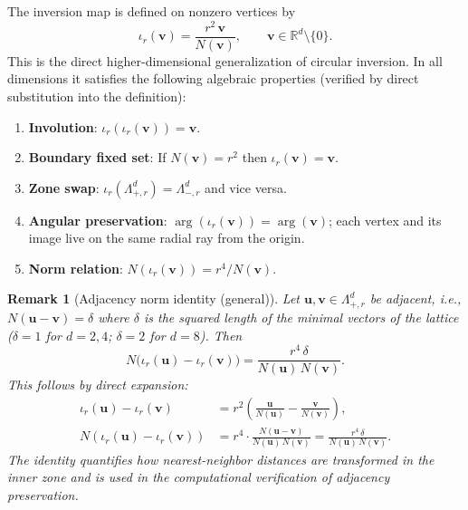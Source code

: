 \documentclass{article}
\newtheorem{remark}{Remark}
\begin{document}
The inversion map is defined on nonzero vertices by
\[
\iota_r(\mathbf{v}) = \frac{r^2 \, \mathbf{v}}{N(\mathbf{v})}, \qquad \mathbf{v} \in \mathbb{R}^d \setminus \{0\}.
\]
This is the direct higher-dimensional generalization of circular inversion. In all dimensions it satisfies the following algebraic properties (verified by direct substitution into the definition):
\begin{enumerate}
  \item \textbf{Involution}: $\iota_r(\iota_r(\mathbf{v})) = \mathbf{v}$.
  \item \textbf{Boundary fixed set}: If $N(\mathbf{v}) = r^2$ then $\iota_r(\mathbf{v}) = \mathbf{v}$.
  \item \textbf{Zone swap}: $\iota_r(\Lambda_{+,r}^d) = \Lambda_{-,r}^d$ and vice versa.
  \item \textbf{Angular preservation}: $\arg(\iota_r(\mathbf{v})) = \arg(\mathbf{v})$; each vertex and its image live on the same radial ray from the origin.
  \item \textbf{Norm relation}: $N(\iota_r(\mathbf{v})) = r^4 / N(\mathbf{v})$.
\end{enumerate}

\begin{remark}[Adjacency norm identity (general)]
\label{rem:general-adjacency-identity}
Let \(\mathbf{u},\mathbf{v}\in\Lambda_{+,r}^d\) be adjacent, i.e., \(N(\mathbf{u}-\mathbf{v})=\delta\) where \(\delta\) is the squared length of the minimal vectors of the lattice (\(\delta=1\) for \(d=2,4\); \(\delta=2\) for \(d=8\)). Then
\[
N\bigl(\iota_r(\mathbf{u})-\iota_r(\mathbf{v})\bigr)=\frac{r^4\,\delta}{N(\mathbf{u})\,N(\mathbf{v})}.
\]
This follows by direct expansion:
\begin{align*}
\iota_r(\mathbf{u})-\iota_r(\mathbf{v})
&= r^2\left(\frac{\mathbf{u}}{N(\mathbf{u})} - \frac{\mathbf{v}}{N(\mathbf{v})}\right), \\
N(\iota_r(\mathbf{u})-\iota_r(\mathbf{v}))
&= r^4 \cdot \frac{N(\mathbf{u}-\mathbf{v})}{N(\mathbf{u})\,N(\mathbf{v})} = \frac{r^4\,\delta}{N(\mathbf{u})\,N(\mathbf{v})}.
\end{align*}
The identity quantifies how nearest-neighbor distances are transformed in the inner zone and is used in the computational verification of adjacency preservation.
\end{remark}
\end{document}
